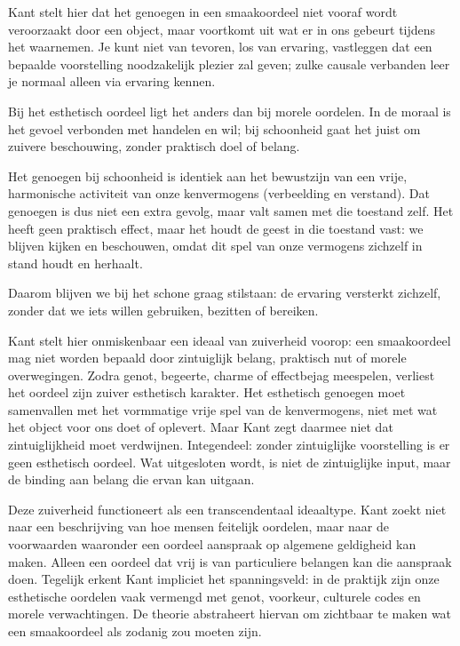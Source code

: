 \begin{mdframed}[leftmargin=0pt,rightmargin=0pt,backgroundcolor=blue!6,linecolor=white,innertopmargin=6pt,innerbottommargin=6pt]
    \sloppy
Kant stelt hier dat het genoegen in een smaakoordeel niet vooraf wordt veroorzaakt door een object, maar voortkomt uit wat er in ons gebeurt tijdens het waarnemen. Je kunt niet van tevoren, los van ervaring, vastleggen dat een bepaalde voorstelling noodzakelijk plezier zal geven; zulke causale verbanden leer je normaal alleen via ervaring kennen.

Bij het esthetisch oordeel ligt het anders dan bij morele oordelen. In de moraal is het gevoel verbonden met handelen en wil; bij schoonheid gaat het juist om zuivere beschouwing, zonder praktisch doel of belang.

Het genoegen bij schoonheid is identiek aan het bewustzijn van een vrije, harmonische activiteit van onze kenvermogens (verbeelding en verstand). Dat genoegen is dus niet een extra gevolg, maar valt samen met die toestand zelf. Het heeft geen praktisch effect, maar het houdt de geest in die toestand vast: we blijven kijken en beschouwen, omdat dit spel van onze vermogens zichzelf in stand houdt en herhaalt.

Daarom blijven we bij het schone graag stilstaan: de ervaring versterkt zichzelf, zonder dat we iets willen gebruiken, bezitten of bereiken.

\bigskip
Kant stelt hier onmiskenbaar een ideaal van zuiverheid voorop: een smaakoordeel mag niet worden bepaald door zintuiglijk belang, praktisch nut of morele overwegingen. Zodra genot, begeerte, charme of effectbejag meespelen, verliest het oordeel zijn zuiver esthetisch karakter. Het esthetisch genoegen moet samenvallen met het vormmatige vrije spel van de kenvermogens, niet met wat het object voor ons doet of oplevert.
Maar Kant zegt daarmee niet dat zintuiglijkheid moet verdwijnen. Integendeel: zonder zintuiglijke voorstelling is er geen esthetisch oordeel. Wat uitgesloten wordt, is niet de zintuiglijke input, maar de binding aan belang die ervan kan uitgaan.

Deze zuiverheid functioneert als een trans\-cen\-dentaal ideaaltype. Kant zoekt niet naar een beschrijving van hoe mensen feitelijk oordelen, maar naar de voor\-waarden waaronder een oordeel aan\-spraak op algemene geldig\-heid kan maken. Alleen een oordeel dat vrij is van particuliere be\-langen kan die aan\-spraak doen.
Tegelijk erkent Kant impliciet het spanningsveld: in de praktijk zijn onze esthetische oordelen vaak vermengd met genot, voorkeur, culturele codes en morele verwachtingen. De theorie abstraheert hiervan om zichtbaar te maken wat een smaakoordeel als zodanig zou moeten zijn.


\end{mdframed}
